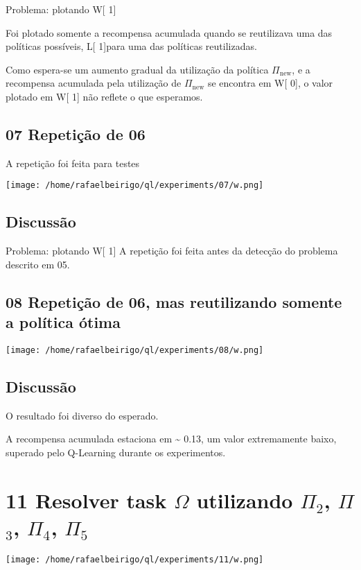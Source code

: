 \documentclass[11pt]{article}
\begin{document}
Problema: plotando W[ 1]

Foi plotado somente a recompensa acumulada quando se reutilizava uma
das políticas possíveis, L[ 1]para uma das políticas
reutilizadas.

Como espera-se um aumento gradual da utilização da política $\Pi$$_{\mathrm{new}}$, e
a recompensa acumulada pela utilização de $\Pi$$_{\mathrm{new}}$ se encontra em W[
0], o valor plotado em W[ 1] não reflete o que esperamos.


\subsection{07 Repetição de 06}
\label{sec-3.15}

A repetição foi feita para testes

\centerline{\texttt{[image: /home/rafaelbeirigo/ql/experiments/07/w.png]}}


\subsection{Discussão}
\label{sec-3.16}

Problema: plotando W[ 1]
A repetição foi feita antes da detecção do problema descrito em 05.


\subsection{08 Repetição de 06, mas reutilizando somente a política ótima}
\label{sec-3.17}

\centerline{\texttt{[image: /home/rafaelbeirigo/ql/experiments/08/w.png]}}


\subsection{Discussão}
\label{sec-3.18}

O resultado foi diverso do esperado.

A recompensa acumulada estaciona em \~{} 0.13, um valor extremamente
baixo, superado pelo Q-Learning durante os experimentos.


\section{11 Resolver task $\Omega$ utilizando  $\Pi$$_2$, $\Pi$$_3$, $\Pi$$_4$, $\Pi$$_5$}
\label{sec-4}

\centerline{\texttt{[image: /home/rafaelbeirigo/ql/experiments/11/w.png]}}
\end{document}
